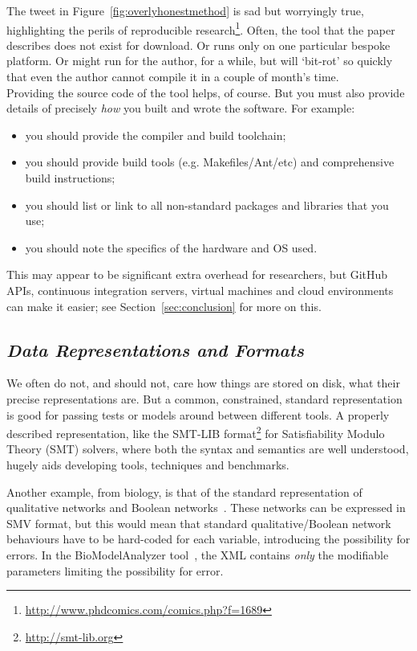 \documentclass[a4paper,11pt]{article}
\begin{document}
The tweet in Figure~\ref{fig:overlyhonestmethod} is sad but worryingly
true, highlighting the perils of reproducible
research\footnote{\url{http://www.phdcomics.com/comics.php?f=1689}}. Often,
the tool that the paper describes does not exist for download. Or runs
only on one particular bespoke platform. Or might run for the author,
for a while, but will `bit-rot' so quickly that even the author cannot
compile it in a couple of month's time.\\

 Providing the
source code of the tool helps, of course. But you must also provide
details of precisely \emph{how} you built and wrote the software. For
example:

\begin{itemize}
\item you should provide the compiler and build toolchain; 
\item you should provide build tools (e.g. Makefiles/Ant/etc) and
  comprehensive build instructions; 
\item you should list or link to all non-standard packages and libraries that you use; 
\item you should note the specifics of the hardware and OS used. 
\end{itemize}

This may appear to be significant extra overhead for researchers, but
GitHub APIs, continuous integration servers, virtual machines and
cloud environments can make it easier; see
Section~\ref{sec:conclusion} for more on this.


\subsection{{\emph{Data Representations and Formats}}}

We often do not, and should not, care how things are stored on disk,
what their precise representations are. But a common, constrained,
standard representation is good for passing tests or models around
between different tools. A properly described representation, like the
SMT-LIB format\footnote{\url{http://smt-lib.org}} for Satisfiability
Modulo Theory (SMT) solvers, where both the syntax and semantics are
well understood, hugely aids developing tools, techniques and
benchmarks.

Another example, from biology, is that of the standard representation
of qualitative networks and Boolean
networks~\cite{Kauffman1969,Schaub2007}.  These networks can be
expressed in SMV format, but this would mean that standard
qualitative/Boolean network behaviours have to be hard-coded for each
variable, introducing the possibility for errors. In the
BioModelAnalyzer tool~\cite{Benque2012}, the XML contains \emph{only}
the modifiable parameters limiting the possibility for error.\\
\end{document}
